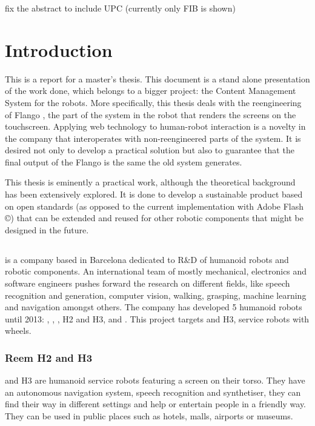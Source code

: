 
fix the abstract to include UPC (currently only FIB is shown)

\chapter{Introduction}
This is a report for a master's thesis.
This document is a stand alone presentation of the work done, which belongs to a bigger project: the Content Management System for the robots.
More specifically, this thesis deals with the reengineering of Flango \cm, the part of the system in the robot that renders the screens on the touchscreen.
Applying web technology to human-robot interaction is a novelty in the company that interoperates with non-reengineered parts of the system.
It is desired not only to develop a practical solution but also to guarantee that the final output of the Flango \cm is the same the old system generates.

This thesis is eminently a practical work, although the theoretical background has been extensively explored. 
It is done to develop a sustainable product based on open standards (as opposed to the current implementation with Adobe Flash \copyright) that can be extended and reused for other robotic components that might be designed in the future.

\section{\company}
\company is a company based in Barcelona dedicated to R\&D of humanoid robots and robotic components. 
An international team of mostly mechanical, electronics and software engineers pushes forward the research on different fields, like speech recognition and generation, computer vision, walking, grasping, machine learning and navigation amongst others.
The company has developed 5 humanoid robots until 2013: , , , H2 and H3, and .
This project targets  and H3, service robots with wheels.

\subsection{Reem H2 and H3}
  and H3  are humanoid service robots featuring a screen on their torso.
They have an autonomous navigation system, speech recognition and synthetiser, they can find their way in different settings and help or entertain people in a friendly way.
They can be used in public places such as hotels, malls, airports or museums.

